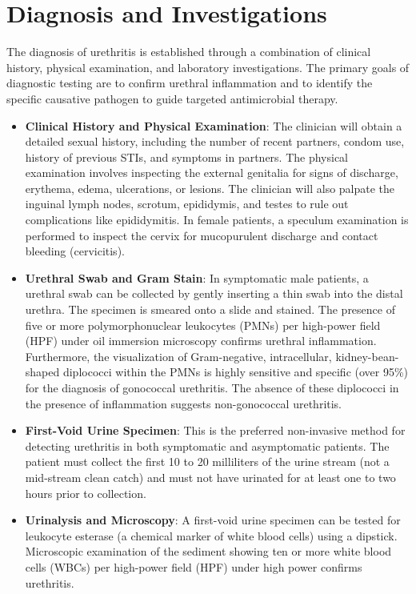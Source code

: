 \section*{Diagnosis and Investigations}
The diagnosis of urethritis is established through a combination of clinical history, physical examination, and laboratory investigations. The primary goals of diagnostic testing are to confirm urethral inflammation and to identify the specific causative pathogen to guide targeted antimicrobial therapy.

\begin{itemize}
    \item \textbf{Clinical History and Physical Examination}: The clinician will obtain a detailed sexual history, including the number of recent partners, condom use, history of previous STIs, and symptoms in partners. The physical examination involves inspecting the external genitalia for signs of discharge, erythema, edema, ulcerations, or lesions. The clinician will also palpate the inguinal lymph nodes, scrotum, epididymis, and testes to rule out complications like epididymitis. In female patients, a speculum examination is performed to inspect the cervix for mucopurulent discharge and contact bleeding (cervicitis).

    \item \textbf{Urethral Swab and Gram Stain}: In symptomatic male patients, a urethral swab can be collected by gently inserting a thin swab into the distal urethra. The specimen is smeared onto a slide and stained. The presence of five or more polymorphonuclear leukocytes (PMNs) per high-power field (HPF) under oil immersion microscopy confirms urethral inflammation. Furthermore, the visualization of Gram-negative, intracellular, kidney-bean-shaped diplococci within the PMNs is highly sensitive and specific (over 95\%) for the diagnosis of gonococcal urethritis. The absence of these diplococci in the presence of inflammation suggests non-gonococcal urethritis.

    \item \textbf{First-Void Urine Specimen}: This is the preferred non-invasive method for detecting urethritis in both symptomatic and asymptomatic patients. The patient must collect the first 10 to 20 milliliters of the urine stream (not a mid-stream clean catch) and must not have urinated for at least one to two hours prior to collection.

    \item \textbf{Urinalysis and Microscopy}: A first-void urine specimen can be tested for leukocyte esterase (a chemical marker of white blood cells) using a dipstick. Microscopic examination of the sediment showing ten or more white blood cells (WBCs) per high-power field (HPF) under high power confirms urethritis.


\end{itemize}
